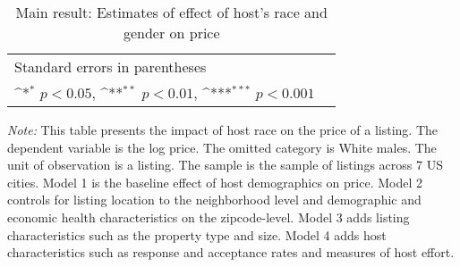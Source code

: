 

\newpage


\newpage


\newpage


\newpage

\begin{table}[htbp]\centering
	\def\sym#1{\ifmmode^{#1}\else\(^{#1}\)\fi}
	\caption{Main result: Estimates of effect of host’s race and gender on price}
	\begin{tabular}{l*{5}{c}}
		\hline\hline
		
		\hline\hline
		\multicolumn{5}{l}{\footnotesize Standard errors in parentheses}\\
		\multicolumn{5}{l}{\footnotesize \sym{*} \(p<0.05\), \sym{**} \(p<0.01\), \sym{***} \(p<0.001\)}\\
	\end{tabular}	
\label{table:price}
	\begin{tablenotes}
		
		\item {\it Note:} This table presents the impact of host race on the price of a listing. The dependent variable is the log price. The omitted category is White males. The unit of observation is a listing. The sample is the sample of listings across 7 US cities. Model 1 is the baseline effect of host demographics on price. Model 2 controls for listing location to the neighborhood level and demographic and economic health characteristics on the zipcode-level. Model 3 adds listing characteristics such as the property type and size. Model 4 adds host characteristics such as response and acceptance rates and measures of host effort.  
	\end{tablenotes}
\end{table}

